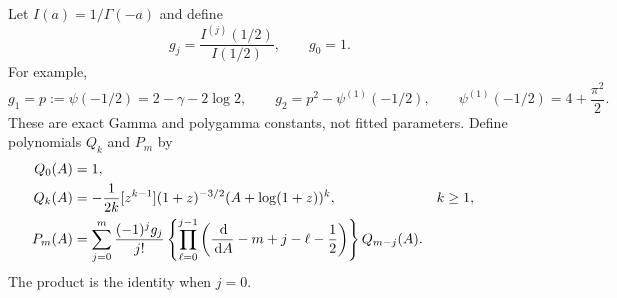 \documentclass[11pt,a4paper]{article}
\theoremstyle{definition}\newtheorem{definition}[theorem]{Definition}
\theoremstyle{remark}\newtheorem{remark}[theorem]{Remark}
\newcommand{\dd}{\,\mathrm d}
\numberwithin{equation}{section}
\begin{document}
Let $I(a)=1/\Gamma(-a)$ and define
\begin{equation}\label{qb:eq:gj}
 g_j=\frac{I^{(j)}(1/2)}{I(1/2)},\qquad g_0=1.
\end{equation}
For example,
\begin{equation}\label{qb:eq:g12}
 g_1=p:=\psi(-1/2)=2-\gamma-2\log2,\qquad
 g_2=p^2-\psi^{(1)}(-1/2),\qquad
 \psi^{(1)}(-1/2)=4+\frac{\pi^2}{2}.
\end{equation}
These are exact Gamma and polygamma constants, not fitted parameters.
Define polynomials $Q_k$ and $P_m$ by
\begin{align}
 Q_0(A)&=1,\notag\\
 Q_k(A)&=-\frac1{2k}[z^{k-1}]
       (1+z)^{-3/2}(A+\log(1+z))^k,
       &&k\ge1,\label{qb:eq:Q}\\
 P_m(A)&=\sum_{j=0}^m\frac{(-1)^j g_j}{j!}
 \left\{\prod_{\ell=0}^{j-1}
 \left(\frac{\dd}{\dd A}-m+j-\ell-\frac12\right)\right\}
 Q_{m-j}(A).\label{qb:eq:P}
\end{align}
The product is the identity when $j=0$.
\end{document}

